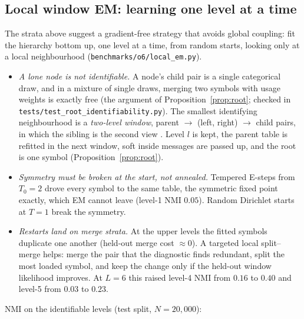 \documentclass[11pt]{article}
\theoremstyle{definition}
\theoremstyle{remark}
\begin{document}
\subsection{Local window EM: learning one level at a time}\label{sec:localem}
The strata above suggest a gradient-free strategy that avoids global coupling: fit the hierarchy bottom up, one level at a time, from random starts, looking only at a local neighbourhood (\texttt{benchmarks/o6/local\_em.py}).
\begin{itemize}
  \item \emph{A lone node is not identifiable.} A node's child pair is a single categorical draw, and in a mixture of single draws, merging two symbols with usage weights is exactly free (the argument of Proposition~\ref{prop:root}; checked in \texttt{tests/test\_root\_identifiability.py}). The smallest identifying neighbourhood is a \emph{two-level window}, parent $\to$ (left, right) $\to$ child pairs, in which the sibling is the second view \cite{amr09}. Level $l$ is kept, the parent table is refitted in the next window, soft inside messages are passed up, and the root is one symbol (Proposition~\ref{prop:root}).
  \item \emph{Symmetry must be broken at the start, not annealed.} Tempered E-steps from $T_0=2$ drove every symbol to the same table, the symmetric fixed point exactly, which EM cannot leave (level-1 NMI $0.05$). Random Dirichlet starts at $T=1$ break the symmetry.
  \item \emph{Restarts land on merge strata.} At the upper levels the fitted symbols duplicate one another (held-out merge cost $\approx0$). A targeted local split--merge helps: merge the pair that the diagnostic finds redundant, split the most loaded symbol, and keep the change only if the held-out window likelihood improves. At $L=6$ this raised level-4 NMI from $0.16$ to $0.40$ and level-5 from $0.03$ to $0.23$.
\end{itemize}
NMI on the identifiable levels (test split, $N=20{,}000$):
\end{document}
